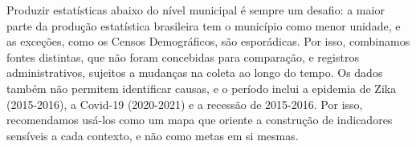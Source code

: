 Produzir estatísticas abaixo do nível municipal é sempre um desafio: a maior parte da produção estatística brasileira tem o município como menor unidade, e as exceções, como os Censos Demográficos, são esporádicas. Por isso, combinamos fontes distintas, que não foram concebidas para comparação, e registros administrativos, sujeitos a mudanças na coleta ao longo do tempo. Os dados também não permitem identificar causas, e o período inclui a epidemia de Zika (2015-2016), a Covid-19 (2020-2021) e a recessão de 2015-2016. Por isso, recomendamos usá-los como um mapa que oriente a construção de indicadores sensíveis a cada contexto, e não como metas em si mesmas.

